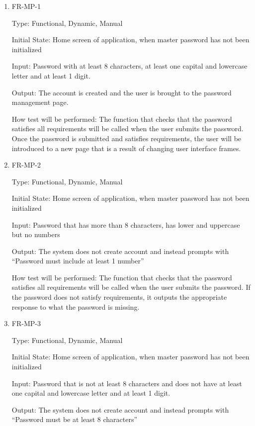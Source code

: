 \documentclass[12pt, titlepage]{article}
\begin{document}
\begin{enumerate}

\item{FR-MP-1\\}

Type: Functional, Dynamic, Manual
					
Initial State: Home screen of application, when master password has not been initialized 
					
Input: Password with at least 8 characters, at least one capital and lowercase letter and at least 1 digit.
					
Output: The account is created and the user is brought to the password management page.

How test will be performed: The function that checks that the password satisfies all requirements will be called when the user submits the password. Once the password is submitted and satisfies requirements, the user will be introduced to a new page that is a result of changing user interface frames.
					
					
\item{FR-MP-2\\}

Type: Functional, Dynamic, Manual

Initial State: Home screen of application, when master password has not been initialized

Input: Password that has more than 8 characters, has lower and uppercase but no numbers

Output: The system does not create account and instead prompts with “Password must include at least 1 number”

How test will be performed: The function that checks that the password satisfies all requirements will be called when the user submits the password. If the password does not satisfy requirements, it outputs the appropriate response to what the password is missing.

\item{FR-MP-3\\}

Type: Functional, Dynamic, Manual

Initial State: Home screen of application, when master password has not been initialized 

Input: Password that is not at least 8 characters and does not have at least one capital and lowercase letter and at least 1 digit.

Output: The system does not create account and instead prompts with “Password must be at least 8 characters”


\end{enumerate}
\end{document}
